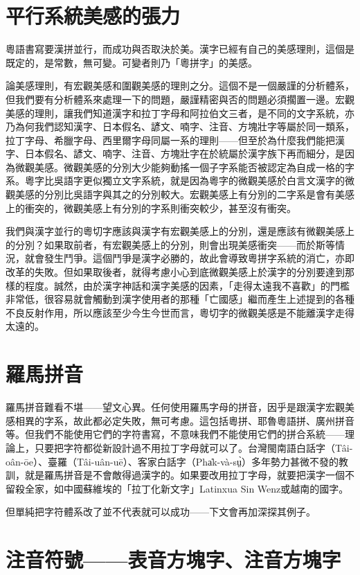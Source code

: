 \documentclass[a5paper, 12pt, openany]{book} %
\begin{document}
\section{平行系統美感的張力}

粵語書寫要漢拼並行，而成功與否取決於美。漢字已經有自己的美感理則，這個是既定的，是常數，無可變。可變者則乃「粵拼字」的美感。

論美感理則，有宏觀美感和圍觀美感的理則之分。這個不是一個嚴謹的分析體系，但我們要有分析體系來處理一下的問題，嚴謹精密與否的問題必須擱置一邊。宏觀美感的理則，讓我們知道漢字和拉丁字母和阿拉伯文三者，是不同的文字系統，亦乃為何我們認知漢字、日本假名、諺文、喃字、注音、方塊壯字等屬於同一類系，拉丁字母、希臘字母、西里爾字母同屬一系的理則——但至於為什麼我們能把漢字、日本假名、諺文、喃字、注音、方塊壯字在於統屬於漢字族下再而細分，是因為微觀美感。微觀美感的分別大少能夠動搖一個子字系能否被認定為自成一格的字系。粵字比吳語字更似獨立文字系統，就是因為粵字的微觀美感於白言文漢字的微觀美感的分別比吳語字與其之的分別較大。宏觀美感上有分別的二字系是會有美感上的衝突的，微觀美感上有分別的字系則衝突較少，甚至沒有衝突。

我們與漢字並行的粵切字應該與漢字有宏觀美感上的分別，還是應該有微觀美感上的分別？如果取前者，有宏觀美感上的分別，則會出現美感衝突——而於斯等情況，就會發生鬥爭。這個鬥爭是漢字必勝的，故此會導致粵拼字系統的消亡，亦即改革的失敗。但如果取後者，就得考慮小心到底微觀美感上於漢字的分別要達到那樣的程度。誠然，由於漢字神話和漢字美感的因素，「走得太遠我不喜歡」的門檻非常低，很容易就會觸動到漢字使用者的那種「亡國感」繼而產生上述提到的各種不良反射作用，所以應該至少今生今世而言，粵切字的微觀美感是不能離漢字走得太遠的。

\section{羅馬拼音}

羅馬拼音難看不堪——望文心異。任何使用羅馬字母的拼音，因乎是跟漢字宏觀美感相異的字系，故此都必定失敗，無可考慮。這包括粵拼、耶魯粵語拼、廣州拼音等。但我們不能使用它們的字符書寫，不意味我們不能使用它們的拼合系統——理論上，只要把字符都從新設計過不用拉丁字母就可以了。台灣閩南語白話字（Tâi-oân-ōe）、臺羅（Tâi-uân-uē）、客家白話字（{\taigi Pha̍k-và-sṳ̀}）多年勢力甚微不發的教訓，就是羅馬拼音是不會敵得過漢字的。如果要改用拉丁字母，就要把漢字一個不留殺全家，如中國蘇維埃的「拉丁化新文字」Latinxua Sin Wenz或越南的國字。


但單純把字符體系改了並不代表就可以成功——下文會再加深探其例子。

\section{注音符號——表音方塊字、注音方塊字}
\end{document}
